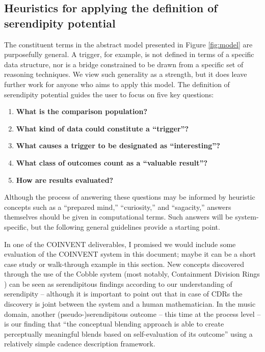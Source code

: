 \subsection{Heuristics for applying the definition of serendipity potential}\label{specs-heuristics}

The constituent terms in the abstract model presented in Figure
\ref{fig:model} are purposefully general.  A trigger, for example, is
not defined in terms of a specific data structure, nor is a bridge
constrained to be drawn from a specific set of reasoning techniques.
We view such generality as a strength, but it does leave further work
for anyone who aims to apply this model.
The definition of serendipity potential guides the user to focus on
five key questions:

\begin{enumerate}
\item \textbf{What is the comparison population?}
\item \textbf{What kind of data could constitute a ``trigger''?}
\item \textbf{What causes a trigger to be designated as ``interesting''?}
\item \textbf{What class of outcomes count as a ``valuable result''?}
\item \textbf{How are results evaluated?}
\end{enumerate}

Although the process of answering these questions may be informed by
heuristic concepts such as a ``prepared mind,'' ``curiosity,'' and
``sagacity,'' answers themselves should be given in computational
terms.  Such answers will be system-specific, but the following
general guidelines provide a starting point.

\begin{newpart}{In one of the COINVENT deliverables, I promised we would include some evaluation of the COINVENT system in this document; maybe it can be a short case study or walk-through example in this section.}
New concepts discovered through the use of the Cobble system (most
notably, Containment Division Rings \cite{bou2015role}) can be seen as
serendipitous findings according to our understanding of serendipity
-- although it is important to point out that in case of CDRs the
discovery is joint between the system and a human mathematician.  In
the music domain, another \mbox{(pseudo-)}serendipitous outcome -- this time
at the process level -- is our finding that ``the conceptual blending
approach is able to create perceptually meaningful blends based on
self-evaluation of its outcome'' \cite{zacharakis2015conceptual} using
a relatively simple cadence description framework.
\end{newpart}


